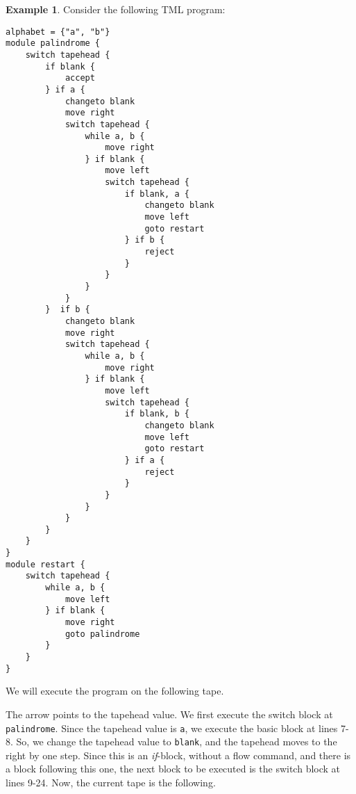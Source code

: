 \documentclass{article}
\theoremstyle{definition}
\newtheorem{example}[rules]{Example}
\theoremstyle{plain}
\begin{document}
    \begin{example}
        Consider the following TML program:
\begin{lstlisting}[language=TML]
alphabet = {"a", "b"}
module palindrome {
    switch tapehead {
        if blank {
            accept
        } if a {
            changeto blank
            move right
            switch tapehead {
                while a, b {
                    move right
                } if blank {
                    move left
                    switch tapehead {
                        if blank, a {
                            changeto blank
                            move left
                            goto restart
                        } if b {
                            reject
                        }
                    }
                }
            }
        }  if b {
            changeto blank
            move right
            switch tapehead {
                while a, b {
                    move right
                } if blank {
                    move left
                    switch tapehead {
                        if blank, b {
                            changeto blank
                            move left
                            goto restart
                        } if a {
                            reject
                        }
                    }
                }
            }
        }
    }
}
module restart {
    switch tapehead {
        while a, b {
            move left
        } if blank {
            move right
            goto palindrome
        }
    }
}
\end{lstlisting}
    We will execute the program on the following tape.
    \begin{figure}[H]
        \centering
    \end{figure}
    \noindent The arrow points to the tapehead value. We first execute the switch block at \texttt{palindrome}. Since the tapehead value is \texttt{a}, we execute the basic block at lines 7-8. So, we change the tapehead value to \texttt{blank}, and the tapehead moves to the right by one step. Since this is an \textit{if}-block, without a flow command, and there is a block following this one, the next block to be executed is the switch block at lines 9-24. Now, the current tape is the following.
    \begin{figure}[H]
        \centering
\end{figure}
\end{example}
\end{document}
